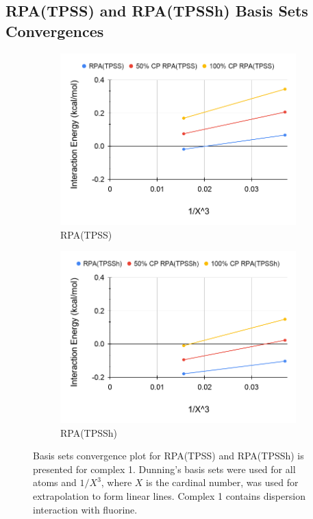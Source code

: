 \documentclass[11pt]{article}
\begin{document}
\subsection{RPA(TPSS) and RPA(TPSSh) Basis Sets Convergences}

\begin{figure}[hbpt]
  \centering
  \begin{subfigure}{.5\textwidth}
    \centering
    \includegraphics[scale=0.3]{tpss-1.png}
    \caption{RPA(TPSS)}
    \label{fig:tpss_1}
  \end{subfigure}%
  \begin{subfigure}{.5\textwidth}
    \centering
    \includegraphics[scale=0.3]{tpssh-1.png}
    \caption{RPA(TPSSh)}
    \label{fig:tpssh_1}
  \end{subfigure}
  \caption{Basis sets convergence plot for RPA(TPSS) and RPA(TPSSh) is
    presented for complex 1. Dunning's basis sets were used for all atoms
    and $1/X^3$, where $X$ is the cardinal number, was used for
    extrapolation to form linear lines. Complex 1 contains dispersion
    interaction with fluorine.}
  \label{fig:complex_1}
\end{figure}
\end{document}
